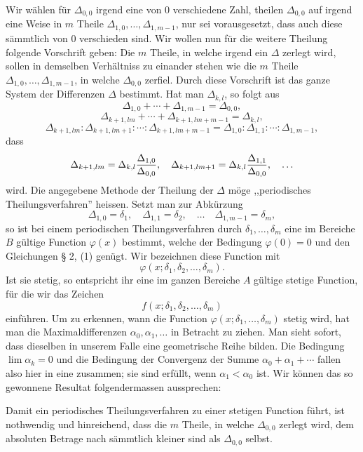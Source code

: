 Wir wählen für $\Delta_{0,0}$ irgend eine von $0$ verschiedene Zahl, theilen $\Delta_{0,0}$ auf irgend eine Weise in $m$ Theile $\Delta_{1,0},\ldots,\Delta_{1,m-1}$, nur sei vorausgesetzt, dass auch diese sämmtlich von $0$ verschieden sind. Wir wollen nun für die weitere Theilung folgende Vorschrift geben: Die $m$ Theile, in welche irgend ein $\Delta$ zerlegt wird, sollen in demselben Verhältniss zu einander stehen wie die $m$ Theile $\Delta_{1,0},\ldots,\Delta_{1,m-1}$, in welche $\Delta_{0,0}$ zerfiel. Durch diese Vorschrift ist das ganze System der Differenzen $\Delta$ bestimmt. Hat man $\Delta_{k,l}$, so folgt aus
\[
 \Delta_{1,0}+\cdots+\Delta_{1,m-1}=\Delta_{0,0},
\]
\[
 \Delta_{k+1,lm}+\cdots+\Delta_{k+1,lm+m-1}=\Delta_{k,l},
\]
\[
 \Delta_{k+1,lm}:\Delta_{k+1,lm+1}:\cdots:\Delta_{k+1,lm+m-1}
 =\Delta_{1,0}:\Delta_{1,1}:\cdots:\Delta_{1,m-1},
\]
dass
\[
 \Delta_{k+1,lm}=\Delta_{k,l}{\Delta_{1,0}\over\Delta_{0,0}},
 \quad
 \Delta_{k+1,lm+1}=\Delta_{k,l}{\Delta_{1,1}\over\Delta_{0,0}},
 \quad\ldots
\]
wird. Die angegebene Methode der Theilung der $\Delta$ möge ,,periodisches Theilungsverfahren'' heissen. Setzt man zur Abkürzung
\[
 \Delta_{1,0}=\delta_1,
 \quad
 \Delta_{1,1}=\delta_2,
 \quad\ldots\quad
 \Delta_{1,m-1}=\delta_m,
\]
so ist bei einem periodischen Theilungsverfahren durch $\delta_1,\ldots,\delta_m$ eine im Bereiche $B$ gültige Function $\varphi(x)$ bestimmt, welche der Bedingung $\varphi(0)=0$ und den Gleichungen § 2, (1) genügt. Wir bezeichnen diese Function mit
\[
 \varphi(x;\delta_1,\delta_2,\ldots,\delta_m).
\]
Ist sie stetig, so entspricht ihr eine im ganzen Bereiche $A$ gültige stetige Function, für die wir das Zeichen
\[
 f(x;\delta_1,\delta_2,\ldots,\delta_m)
\]
einführen. Um zu erkennen, wann die Function $\varphi(x;\delta_1,\ldots,\delta_m)$ stetig wird, hat man die Maximaldifferenzen $\alpha_0,\alpha_1,\ldots$ in Betracht zu ziehen. Man sieht sofort, dass dieselben in unserem Falle eine geometrische Reihe bilden. Die Bedingung $\lim\alpha_k=0$ und die Bedingung der Convergenz der Summe $\alpha_0+\alpha_1+\cdots$ fallen also hier in eine zusammen; sie sind erfüllt, wenn $\alpha_1<\alpha_0$ ist. Wir können das so gewonnene Resultat folgendermassen aussprechen:

Damit ein periodisches Theilungsverfahren zu einer stetigen Function führt, ist nothwendig und hinreichend, dass die $m$ Theile, in welche $\Delta_{0,0}$ zerlegt wird, dem absoluten Betrage nach sämmtlich kleiner sind als $\Delta_{0,0}$ selbst.

